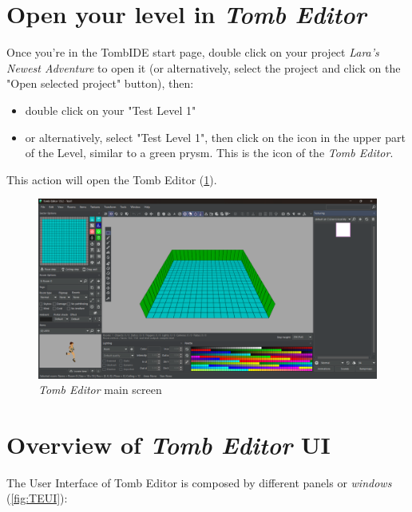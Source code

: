 \section{Open your level in \emph{Tomb Editor}}
Once you're in the TombIDE start page, double click on your project \emph{Lara's Newest Adventure} to open it (or alternatively, select the project and click on the "Open selected project" button), then:
\begin{itemize}
    \item double click on your "Test Level 1"
    \item or alternatively, select "Test Level 1", then click on the icon in the upper part of the Level, similar to a green prysm. This is the icon of the \emph{Tomb Editor}.
\end{itemize}
This action will open the Tomb Editor (\ref{fig:te1000}).

\begin{figure}
    \centering
     \includegraphics[width=1\textwidth]{screenshots/1000.png}
     \caption{\emph{Tomb Editor} main screen}
     \label{fig:te1000} 
\end{figure}

\section{Overview of \emph{Tomb Editor} UI}

The User Interface of Tomb Editor is composed by different panels or \emph{windows} (\ref{fig:TEUI}):

